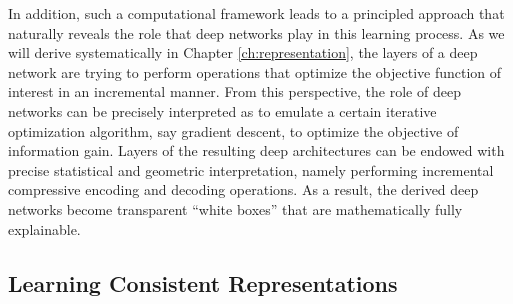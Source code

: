 \documentclass[../../book-main.tex]{subfiles}
\begin{document}
In addition, such a computational framework leads to a principled approach that naturally reveals the role that deep networks play in this learning process. As we will derive systematically in Chapter \ref{ch:representation}, the layers of a deep network are trying to perform operations that optimize the objective function of interest in an incremental manner. From this perspective, the role of deep networks can be precisely interpreted as to emulate a certain iterative optimization algorithm, say gradient descent, to optimize the objective of information gain. Layers of the resulting deep architectures can be endowed with precise statistical and geometric interpretation, namely performing incremental compressive encoding and decoding operations. As a result, the derived deep networks become transparent ``white boxes'' that are mathematically fully explainable.  











\subsection{Learning Consistent Representations}
\end{document}
